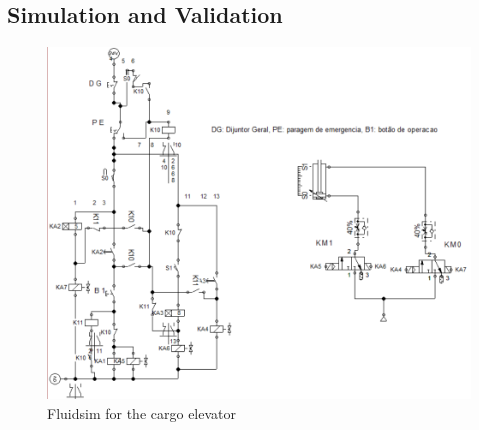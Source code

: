 \subsection{Simulation and Validation} \label{sec:Simulation_and_Validation}

\begin{figure}[H]
    \includegraphics[width=16cm]{Images/Q3/fluidsim.png}
    \centering
    \caption{Fluidsim for the cargo elevator}
    \label{fig:fluidsim}
\end{figure}

